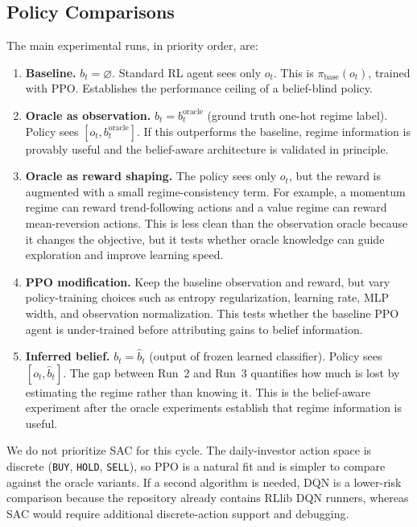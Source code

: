 \documentclass[11pt]{article}
\begin{document}
\subsection{Policy Comparisons}

The main experimental runs, in priority order, are:

\begin{enumerate}[label=\textbf{Run \arabic*.}]

\item \textbf{Baseline.} $b_t = \varnothing$. Standard RL agent sees only $o_t$. This is
$\pi_{\text{base}}(o_t)$, trained with PPO. Establishes the performance ceiling of a
belief-blind policy.

\item \textbf{Oracle as observation.} $b_t = b_t^{\text{oracle}}$ (ground truth one-hot regime label). Policy
sees $[o_t, b_t^{\text{oracle}}]$. If this outperforms the baseline, regime information is
provably useful and the belief-aware architecture is validated in principle.

\item \textbf{Oracle as reward shaping.} The policy sees only $o_t$, but the reward is augmented
with a small regime-consistency term. For example, a momentum regime can reward trend-following
actions and a value regime can reward mean-reversion actions. This is less clean than the observation
oracle because it changes the objective, but it tests whether oracle knowledge can guide exploration
and improve learning speed.

\item \textbf{PPO modification.} Keep the baseline observation and reward, but vary policy-training
choices such as entropy regularization, learning rate, MLP width, and observation normalization. This
tests whether the baseline PPO agent is under-trained before attributing gains to belief information.

\item \textbf{Inferred belief.} $b_t = \hat{b}_t$ (output of frozen learned classifier). Policy
sees $[o_t, \hat{b}_t]$. The gap between Run~2 and Run~3 quantifies how much is lost by
estimating the regime rather than knowing it. This is the belief-aware experiment after the oracle
experiments establish that regime information is useful.

\end{enumerate}

We do not prioritize SAC for this cycle. The daily-investor action space is discrete
(\texttt{BUY}, \texttt{HOLD}, \texttt{SELL}), so PPO is a natural fit and is simpler to compare
against the oracle variants. If a second algorithm is needed, DQN is a lower-risk comparison because
the repository already contains RLlib DQN runners, whereas SAC would require additional discrete-action
support and debugging.
\end{document}
